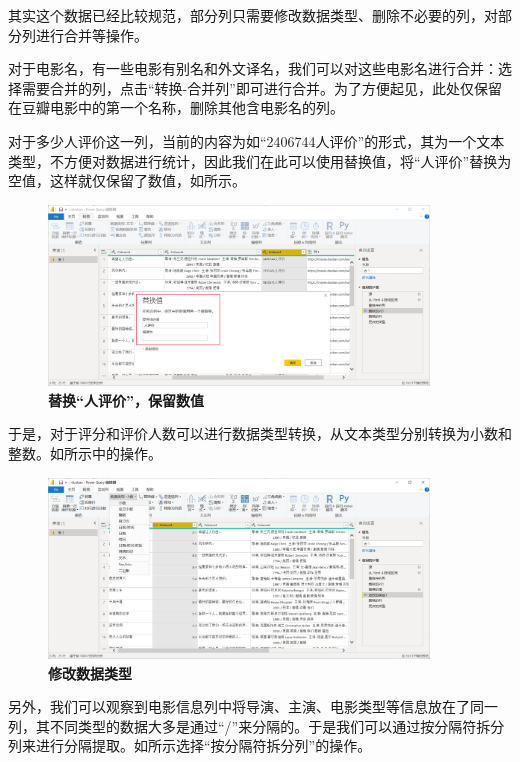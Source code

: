 其实这个数据已经比较规范，部分列只需要修改数据类型、删除不必要的列，对部分列进行合并等操作。

对于电影名，有一些电影有别名和外文译名，我们可以对这些电影名进行合并：选择需要合并的列，点击``转换-合并列''即可进行合并。为了方便起见，此处仅保留在豆瓣电影中的第一个名称，删除其他含电影名的列。

对于多少人评价这一列，当前的内容为如``2406744人评价''的形式，其为一个文本类型，不方便对数据进行统计，因此我们在此可以使用替换值，将``人评价''替换为空值，这样就仅保留了数值，如所示。

\begin{figure}[htbp]
    \centering
    \includegraphics[width=0.9\textwidth]{figure/PowerBI/douban_data_replace.png}
    \caption{\textbf{替换``人评价''，保留数值}}
    \label{fig:douban_data_replace}
\end{figure}

于是，对于评分和评价人数可以进行数据类型转换，从文本类型分别转换为小数和整数。如所示中的操作。

\begin{figure}[htbp]
    \centering
    \includegraphics[width=0.9\textwidth]{figure/PowerBI/douban_data_type.png}
    \caption{\textbf{修改数据类型}}
    \label{fig:douban_data_type}
\end{figure}

另外，我们可以观察到电影信息列中将导演、主演、电影类型等信息放在了同一列，其不同类型的数据大多是通过``/''来分隔的。于是我们可以通过按分隔符拆分列来进行分隔提取。如所示选择``按分隔符拆分列''的操作。

